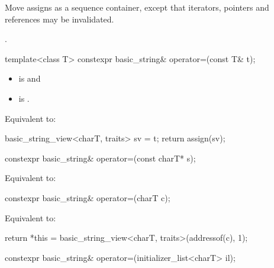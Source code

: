 \begin{itemdescr}
\pnum
\effects
Move assigns as a sequence container,
except that iterators, pointers and references may be invalidated.

\pnum
\returns
{}.
\end{itemdescr}

%
\begin{itemdecl}
template<class T>
  constexpr basic_string& operator=(const T& t);
\end{itemdecl}

\begin{itemdescr}
\pnum
\constraints
\begin{itemize}
\item {}
is  and
\item {}
is .
\end{itemize}

\pnum
\effects
Equivalent to:
\begin{codeblock}
basic_string_view<charT, traits> sv = t;
return assign(sv);
\end{codeblock}
\end{itemdescr}

%
\begin{itemdecl}
constexpr basic_string& operator=(const charT* s);
\end{itemdecl}

\begin{itemdescr}
\pnum
\effects
Equivalent to:
\end{itemdescr}

%
\begin{itemdecl}
constexpr basic_string& operator=(charT c);
\end{itemdecl}

\begin{itemdescr}
\pnum
\effects
Equivalent to:
\begin{codeblock}
return *this = basic_string_view<charT, traits>(addressof(c), 1);
\end{codeblock}
\end{itemdescr}

%
\begin{itemdecl}
constexpr basic_string& operator=(initializer_list<charT> il);
\end{itemdecl}

